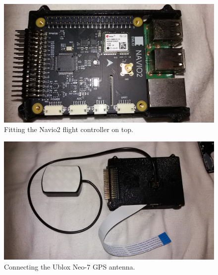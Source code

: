 \begin{figure}
\centering
\includegraphics[scale=0.1]{images/drone-build-3dcase-pi-navio.jpg}
\caption{Fitting the Navio2 flight controller on top.}
\label{fig:frame}
\end{figure}

\begin{figure}
\centering
\includegraphics[scale=0.1]{images/drone-build-3dcase-gps.jpg}
\caption{Connecting the Ublox Neo-7 GPS antenna.}
\label{fig:frame}
\end{figure}

